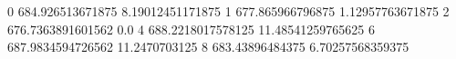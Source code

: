 0 684.926513671875 8.19012451171875
1 677.865966796875 1.12957763671875
2 676.7363891601562 0.0
4 688.2218017578125 11.48541259765625
6 687.9834594726562 11.2470703125
8 683.43896484375 6.70257568359375
